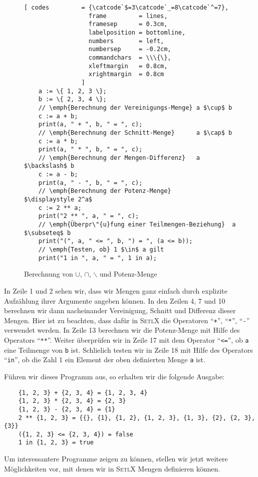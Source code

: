\begin{figure}[!ht]
  \centering
\begin{Verbatim}[ codes         = {\catcode`$=3\catcode`_=8\catcode`^=7},
                  frame         = lines, 
                  framesep      = 0.3cm, 
                  labelposition = bottomline,
                  numbers       = left,
                  numbersep     = -0.2cm,
                  commandchars  = \\\{\},
                  xleftmargin   = 0.8cm,
                  xrightmargin  = 0.8cm
                ]
    a := \{ 1, 2, 3 \};
    b := \{ 2, 3, 4 \};
    // \emph{Berechnung der Vereinigungs-Menge} a $\cup$ b 
    c := a + b;
    print(a, " + ", b, " = ", c);
    // \emph{Berechnung der Schnitt-Menge}      a $\cap$ b
    c := a * b;
    print(a, " * ", b, " = ", c);
    // \emph{Berechnung der Mengen-Differenz}   a $\backslash$ b
    c := a - b;
    print(a, " - ", b, " = ", c);
    // \emph{Berechnung der Potenz-Menge}      $\displaystyle 2^a$
    c := 2 ** a;
    print("2 ** ", a, " = ", c);
    // \emph{Überpr\"{u}fung einer Teilmengen-Beziehung}  a $\subseteq$ b
    print("(", a, " <= ", b, ") = ", (a <= b)); 
    // \emph{Testen, ob} 1 $\in$ a gilt
    print("1 in ", a, " = ", 1 in a);
\end{Verbatim} 
\vspace*{-0.3cm}
\caption{Berechnung von $\cup$, $\cap$, $\backslash$ und Potenz-Menge}
  \label{fig:simple.stlx}
\end{figure} %

\noindent
In Zeile 1 und 2 sehen wir, dass wir Mengen ganz einfach durch explizite Aufz\"{a}hlung ihrer
Argumente angeben k\"{o}nnen.  In den Zeilen 4, 7 und 10 berechnen wir dann nacheinander 
Vereinigung, Schnitt und Differenz dieser Mengen.  Hier ist zu beachten, dass daf\"{u}r
in \textsc{SetlX} die Operatoren ``\texttt{+}'', ``\texttt{*}'', ``\texttt{-}''
verwendet werden.  
In Zeile 13 berechnen wir die Potenz-Menge mit Hilfe des Operators ``\texttt{**}''.
Weiter \"{u}berpr\"{u}fen wir in Zeile 17 mit dem Operator ``\texttt{<=}'', 
ob \texttt{a} eine Teilmenge von \texttt{b} ist.  Schlie\3lich testen wir in Zeile 18 mit Hilfe des
Operators ``\texttt{in}'', ob die Zahl 1 ein Element der oben definierten Menge \texttt{a} ist.

F\"{u}hren wir dieses Programm aus, so
erhalten wir die folgende Ausgabe:
\begin{verbatim}
    {1, 2, 3} + {2, 3, 4} = {1, 2, 3, 4}
    {1, 2, 3} * {2, 3, 4} = {2, 3}
    {1, 2, 3} - {2, 3, 4} = {1}
    2 ** {1, 2, 3} = {{}, {1}, {1, 2}, {1, 2, 3}, {1, 3}, {2}, {2, 3}, {3}}
    ({1, 2, 3} <= {2, 3, 4}) = false
    1 in {1, 2, 3} = true
\end{verbatim}
Um interessantere Programme zeigen zu k\"{o}nnen, stellen wir jetzt weitere
M\"{o}glichkeiten vor, mit denen wir in \textsc{SetlX} Mengen definieren k\"{o}nnen.

